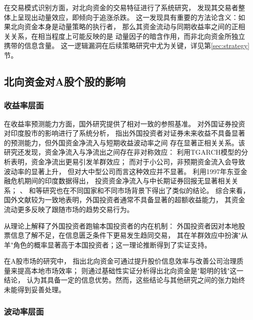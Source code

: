\documentclass{article}
\begin{document}
在交易模式识别方面，\cite{经管实证}对北向资金的交易特征进行了系统研究，
发现其交易者整体上呈现出动量效应，即倾向于追涨杀跌。
这一发现具有重要的方法论含义：如果北向资金本身是动量策略的执行者，
那么其资金流动与同期收益率之间的正相关关系，在相当程度上可能反映的是
动量因子的暗含作用，而非北向资金所独立携带的信息含量。
这一逻辑漏洞在后续策略研究中尤为关键，详见第\ref{sec:strategy}节。

\subsection{北向资金对A股个股的影响}
\label{subsec:impact}

\subsubsection{收益率层面}

在收益率预测能力方面，国外研究提供了相对一致的参照基准。
\cite{doi:10.1080/23322039.2020.1754321}对外国证券投资对印度股市的影响进行了系统分析，
指出外国投资者对证券未来收益不具备显著的预测能力，但外国资金净流入与短期收益波动率之间
存在显著正相关关系。该研究还发现，资金净流入与净流出之间存在非对称效应：
利用TGARCH模型的分析表明，资金净流出更易引发羊群效应；
而对于小公司，非预期资金流入会导致波动率的显著上升，
但对大中型公司而言这种效应并不显著。
\cite{CHAKRABARTI20021}利用1997年东亚金融危机期间的印度数据得出，
投资资金净流入与中长期证券回报无显著相关关系；
\cite{CHOE1999227}、\cite{RePEc:bin:bpeajo:v:29:y:1998:i:1998-2:p:137-206}
和\cite{KIM200277}等研究也在不同国家和不同市场背景下得出了类似的结论。
综合来看，国外文献较为一致地表明，外国投资者通常不具备显著的超额收益能力，
其资金流动更多反映了跟随市场的趋势交易行为。

\cite{ctx3501173690004886}从理论上解释了外国投资者跑输本国投资者的内在机制：
外国投资者因对本地股票信息了解不足，在信息匮乏条件下更易发生趋同交易，
其在羊群效应中扮演"从羊"角色的概率显著高于本国投资者；这一理论推断得到了实证支持。

在A股市场的研究中，\cite{RePEc:eee:finlet:v:56:y:2023:i:c:s1544612323005470}
指出北向资金可通过提升股价信息效率与改善公司治理质量来提高本地市场效率；
\cite{123}则通过基础性实证分析得出北向资金是"聪明的钱"这一结论，
认为其具备一定的信息优势。然而，这些结论与其他研究之间的张力始终未能得到妥善处理。

\subsubsection{波动率层面}
\end{document}
